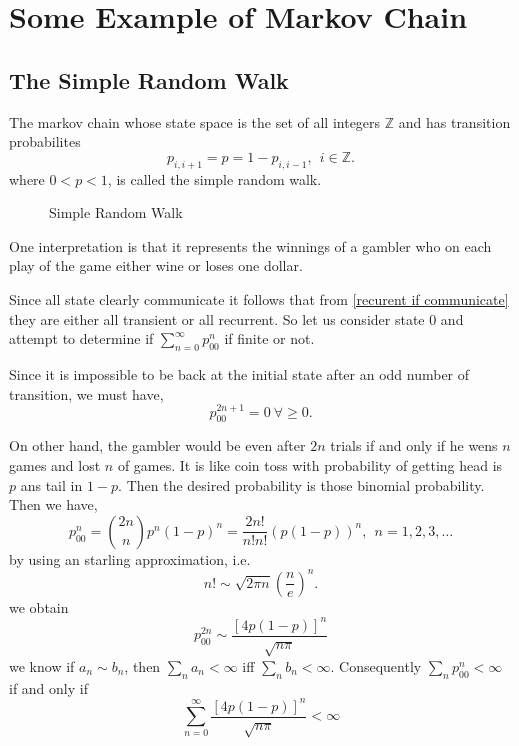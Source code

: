 \chapter{Some Example of Markov Chain}
\section{The Simple Random Walk}
The markov chain whose state space is the set of all integers $ \mathds{Z} $ and has transition probabilites
\[
    p_{i,i+1} = p = 1-p_{i,i-1}, \ \ i\in\mathds{Z}.
\]
where $ 0<p<1 $, is called the simple random walk.

\begin{figure}[h]
    \centering
    \caption{Simple Random Walk}
    \label{Simple random walk}
\end{figure}

One interpretation is that it represents the winnings of a gambler who on each play of the game either wine or loses one dollar.

Since all state clearly communicate it follows that from \cref{recurent if communicate} they are either all transient or all recurrent. 
So let us consider state 0 and
attempt to determine if  $ \sum_{n=0}^{\infty} p_{00}^{n} $ if finite or not.

Since it is impossible to be back at the initial state after an odd number of transition, we must have,
\[
    p^{2n+1}_{00} = 0 \ \forall \ge 0.
\]

On other hand, the gambler would be even after $ 2n $ trials if and only if he wens  $ n $ games and lost  $ n $ of games.
It is like coin toss with probability of getting head is $ p $ ans tail in  $ 1-p $. Then the desired probability is those binomial probability.
Then we have,
 \[
     p^{n}_{00} = \binom{2n}{n}p^{n}(1-p)^{n} = \frac{2n!}{n!n!}(p(1-p))^{n}, \ \ n=1,2,3,\ldots
\]
by using an starling approximation,
i.e.
\[
    n! \sim \sqrt{2\pi n}\left(\frac{n}{e}\right)^{n}.
\]
we obtain 
\[
    p^{2n}_{00}\sim \frac{[4p(1-p)]^{n}}{\sqrt{n\pi}}
\]
we know if $ a_{n}\sim b_{n} $, then $ \sum_{n}a_{n}<\infty  $ iff $ \sum_{n}b_{n}<\infty  $. Consequently $ \sum_{n}p^{n}_{00}<\infty  $ 
if and only if
\[
    \sum_{n=0}^{\infty} \frac{[4p(1-p)]^{n}}{\sqrt{n\pi}} < \infty
\]

